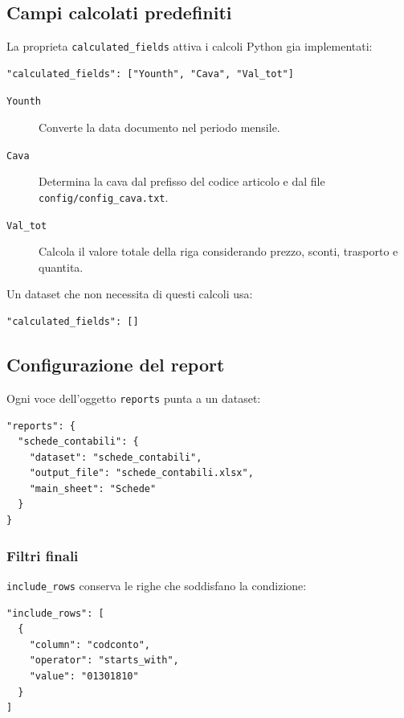 \subsection{Campi calcolati predefiniti}

La proprieta \texttt{calculated\_fields} attiva i calcoli Python gia
implementati:

\begin{lstlisting}
"calculated_fields": ["Younth", "Cava", "Val_tot"]
\end{lstlisting}

\begin{description}
  \item[\texttt{Younth}]
  Converte la data documento nel periodo mensile.

  \item[\texttt{Cava}]
  Determina la cava dal prefisso del codice articolo e dal file
  \texttt{config/config\_cava.txt}.

  \item[\texttt{Val\_tot}]
  Calcola il valore totale della riga considerando prezzo, sconti, trasporto
  e quantita.
\end{description}

Un dataset che non necessita di questi calcoli usa:

\begin{lstlisting}
"calculated_fields": []
\end{lstlisting}

\subsection{Configurazione del report}

Ogni voce dell'oggetto \texttt{reports} punta a un dataset:

\begin{lstlisting}
"reports": {
  "schede_contabili": {
    "dataset": "schede_contabili",
    "output_file": "schede_contabili.xlsx",
    "main_sheet": "Schede"
  }
}
\end{lstlisting}

\subsubsection{Filtri finali}

\texttt{include\_rows} conserva le righe che soddisfano la condizione:

\begin{lstlisting}
"include_rows": [
  {
    "column": "codconto",
    "operator": "starts_with",
    "value": "01301810"
  }
]
\end{lstlisting}

